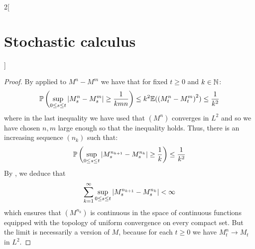 \documentclass[../../../main_math.tex]{subfiles}
\begin{document}
\begin{multicols}{2}[\section{Stochastic calculus}]
\begin{proposition}
  \end{proposition}
  \begin{proof}
    By  applied to $M^n-M^m$ we have that for fixed $t\geq 0$ and $k\in\mathbb{N}$:
    $$
      \mathbb{P}\left(\sup_{0\leq s\leq t}\abs{M_s^n-M_s^m}\geq \frac{1}{kmn }\right)\leq k^2\mathbb{E}({(M_t^n-M_t^m)}^2)\leq \frac{1}{k^2}
    $$
    where in the last inequality we have used that ${(M^n)}$ converges in $L^2$ and so we have chosen $n,m$ large enough so that the inequality holds. Thus, there is an increasing sequence $(n_k)$ such that:
    $$
      \mathbb{P}\left(\sup_{0\leq s\leq t}\abs{M_s^{n_{k+1}}-M_s^{n_k}}\geq \frac{1}{k}\right)\leq \frac{1}{k^2}
    $$
    By , we deduce that
    $$
      \sum_{k=1}^{\infty}\sup_{0\leq s\leq t}\abs{M_s^{n_{k+1}}-M_s^{n_k}}<\infty
    $$
    which ensures that $(M^{n_k})$ is continuous in the space of continuous functions equipped with the topology of uniform convergence on every compact set. But the limit is necessarily a version of $M$, because for each $t\geq 0$ we have $M_t^n\to M_t$ in $L^2$.
  \end{proof}

\end{multicols}
\end{document}
